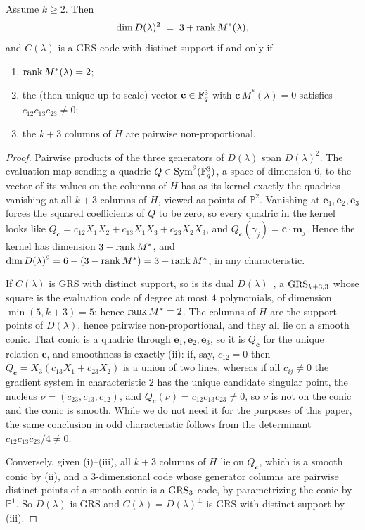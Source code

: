\begin{lemma}\label{lem:fastp2-dual}
Assume $k \geq 2$. Then
\[
    \dim D(\lambda)^{2} \;=\; 3 + \operatorname{rank} M^{*}(\lambda),
\]
and $C(\lambda)$ is a GRS code with distinct support if and only if
\begin{enumerate}
\item[(i)] $\operatorname{rank} M^{*}(\lambda) = 2$;
\item[(ii)] the (then unique up to scale) vector $\mathbf{c} \in
\mathbb{F}_q^3$ with $\mathbf{c}\, M^{*}(\lambda) = 0$ satisfies $c_{12}
c_{13} c_{23} \neq 0$;
\item[(iii)] the $k+3$ columns of $H$ are pairwise
non-proportional.
\end{enumerate}
\end{lemma}

\begin{proof}
Pairwise products of the three generators of $D(\lambda)$ span
$D(\lambda)^2$. The evaluation map sending a quadric
$Q \in \mathrm{Sym}^2(\mathbb{F}_q^3)$, a space of dimension $6$, to the
vector of its values on the columns of $H$ has as its kernel
exactly the quadrics vanishing at all $k+3$ columns of $H$,
viewed as points of $\mathbb{P}^2$. Vanishing at
$\mathbf{e}_1, \mathbf{e}_2, \mathbf{e}_3$ forces the squared
coefficients of $Q$ to be zero, so every quadric in the kernel
looks like $Q_{\mathbf{c}} = c_{12}X_1X_2 + c_{13}X_1X_3 +
c_{23}X_2X_3$, and $Q_{\mathbf{c}}(\gamma_j) =
\mathbf{c}\cdot\mathbf{m}_j$. Hence the kernel has dimension
$3 - \operatorname{rank} M^{*}$, and $\dim D(\lambda)^2 = 6 - (3 - \operatorname{rank} M^{*})
= 3 + \operatorname{rank} M^{*}$, in any characteristic.

If $C(\lambda)$ is GRS with distinct support, so is its dual
$D(\lambda)$~\cite{MS77}, a $\mathrm{GRS}_{k+3,3}$ whose square is the
evaluation code of degree at most $4$ polynomials, of dimension
$\min(5, k+3) = 5$; hence $\operatorname{rank} M^{*} = 2$. The columns of $H$
are the support points of $D(\lambda)$, hence pairwise
non-proportional, and they all lie on a smooth conic. That conic
is a quadric through $\mathbf{e}_1,\mathbf{e}_2,\mathbf{e}_3$,
so it is $Q_{\mathbf{c}}$ for the unique relation
$\mathbf{c}$, and smoothness is exactly (ii): if, say,
$c_{12} = 0$ then $Q_{\mathbf{c}} = X_3(c_{13}X_1 + c_{23}X_2)$
is a union of two lines, whereas if all $c_{ij} \neq 0$ the
gradient system in characteristic $2$ has the unique candidate
singular point, the nucleus $\nu = (c_{23}, c_{13}, c_{12})$,
and $Q_{\mathbf{c}}(\nu) = c_{12}c_{13}c_{23} \neq 0$, so $\nu$
is not on the conic and the conic is smooth.  While we do not need 
it for the purposes of this paper, the same conclusion
in odd characteristic follows from the determinant
$c_{12}c_{13}c_{23}/4 \neq 0$.

Conversely, given (i)--(iii), all $k+3$ columns of $H$ lie on
$Q_{\mathbf{c}}$, which is a smooth conic by (ii), and a
$3$-dimensional code whose generator columns are pairwise
distinct points of a smooth conic is a $\mathrm{GRS}_{3}$ code, by
parametrizing the conic by $\mathbb{P}^1$. So $D(\lambda)$ is
GRS and $C(\lambda) = D(\lambda)^{\perp}$ is GRS with distinct
support by (iii).
\end{proof}

